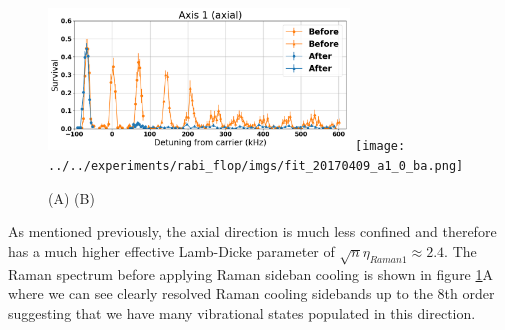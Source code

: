 \documentclass[aps,prl,twocolumn,groupedaddress]{revtex4-1}
\begin{document}
\begin{figure}
  \includegraphics[width=8cm]{imgs/spectrum_a1.png}
  \texttt{[image: ../../experiments/rabi\_flop/imgs/fit\_20170409\_a1\_0\_ba.png]}
  \caption{(A) (B) \label{f-axial}}
\end{figure}

As mentioned previously, the axial direction is much less confined and therefore has a much higher
effective Lamb-Dicke parameter of $\sqrt{n}\eta_{Raman1}\approx2.4$. The Raman spectrum before applying Raman sideban cooling is shown in figure \ref{f-axial}A where we can see clearly resolved Raman cooling sidebands up to the 8th order suggesting that we have many vibrational states populated in this direction.\\
\end{document}

